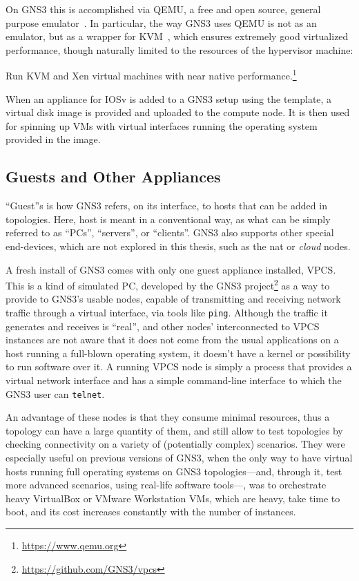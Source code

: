 On GNS3 this is accomplished via QEMU, a free and open source, general purpose emulator~\cite{qemu}.
In particular, the way GNS3 uses QEMU is not as an emulator, but as a wrapper for KVM~\cite{whatiskvm}, which ensures extremely good virtualized performance, though naturally limited to the resources of the hypervisor machine:
\begin{displayquote}
Run KVM and Xen virtual machines with near native performance.\footnote{\url{https://www.qemu.org}}
\end{displayquote}

When an appliance for IOSv is added to a GNS3 setup using the template, a virtual disk image is provided and uploaded to the compute node.
It is then used for spinning up VMs with virtual interfaces running the operating system provided in the image. %

\subsection{Guests and Other Appliances}
\label{subsec:gns3guestsappliances}

``Guest''s is how GNS3 refers, on its interface, to hosts that can be added in topologies.
Here, host is meant in a conventional way, as what can be simply referred to as ``PCs'', ``servers'', or ``clients''.
GNS3 also supports other special end-devices, which are not explored in this thesis, such as the \acrshort{nat} or \emph{cloud} nodes.

A fresh install of GNS3 comes with only one guest appliance installed, VPCS.
This is a kind of simulated PC, developed by the GNS3 project\footnote{\url{https://github.com/GNS3/vpcs}} as a way to provide to GNS3's usable nodes, capable of transmitting and receiving network traffic through a virtual interface, via tools like \texttt{ping}.
Although the traffic it generates and receives is ``real'', and other nodes' interconnected to VPCS instances are not aware that it does not come from the usual applications on a host running a full-blown operating system, it doesn't have a kernel or possibility to run software over it.
A running VPCS node is simply a process that provides a virtual network interface and has a simple command-line interface to which the GNS3 user can \texttt{telnet}.

An advantage of these nodes is that they consume minimal resources, thus a topology can have a large quantity of them, and still allow to test topologies by checking connectivity on a variety of (potentially complex) scenarios.
They were especially useful on previous versions of GNS3, when the only way to have virtual hosts running full operating systems on GNS3 topologies---and, through it, test more advanced scenarios, using real-life software tools---, was to orchestrate heavy VirtualBox or VMware Workstation VMs, which are heavy, take time to boot, and its cost increases constantly with the number of instances.

